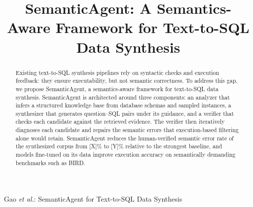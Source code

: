 \documentclass[letterpaper,journal]{IEEEtran}
\begin{document}
\title{SemanticAgent: A Semantics-Aware Framework for Text-to-SQL Data Synthesis}

\author{



}


%
{Gao \MakeLowercase{\textit{et al.}}: SemanticAgent for Text-to-SQL Data Synthesis}


\maketitle

\begin{abstract}
Existing text-to-SQL synthesis pipelines rely on syntactic checks and execution feedback: they ensure executability, but not semantic correctness.
To address this gap, we propose SemanticAgent, a semantics-aware framework for text-to-SQL data synthesis.
SemanticAgent is architected around three components: an analyzer that infers a structured knowledge base from database schemas and sampled instances, a synthesizer that generates question--SQL pairs under its guidance, and a verifier that checks each candidate against the retrieved evidence.
The verifier then iteratively diagnoses each candidate and repairs the semantic errors that execution-based filtering alone would retain.
SemanticAgent reduces the human-verified semantic error rate of the synthesized corpus from [X]\% to [Y]\% relative to the strongest baseline, and models fine-tuned on its data improve execution accuracy on semantically demanding benchmarks such as BIRD.
\end{abstract}
\end{document}
